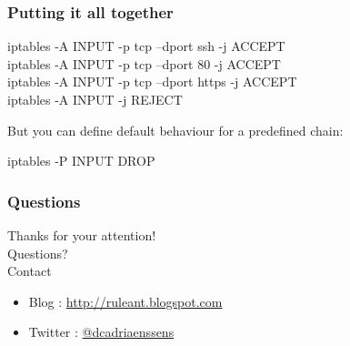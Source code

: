 \documentclass[14pt]{beamer}
\begin{document}
  \begin{frame}
    \frametitle{Putting it all together}
    \begin{example}
      \small{iptables -A INPUT -p tcp --dport ssh -j ACCEPT\\
      iptables -A INPUT -p tcp --dport 80 -j ACCEPT\\
      iptables -A INPUT -p tcp --dport https -j ACCEPT\\
      iptables -A INPUT -j REJECT}
    \end{example}
    But you can define default behaviour for a predefined chain:
    \begin{example}
      \small{iptables -P INPUT DROP}
    \end{example}
  \end{frame}
  \begin{frame}
   \frametitle{Questions}
    Thanks for your attention!\\
    Questions?\\
    Contact
    \begin{itemize}
      \item Blog : \href{http://ruleant.blogspot.com/}{http://ruleant.blogspot.com}
      \item Twitter : \href{https://twitter.com/dcadriaenssens}{@dcadriaenssens}
    \end{itemize}
  \end{frame}
\end{document}
